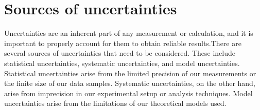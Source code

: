 \section{Sources of uncertainties}
\label{sec:sources-of-uncertainties}
Uncertainties are an inherent part of any measurement or calculation, and it is important to properly account for them to obtain reliable results.There are several sources of uncertainties that need to be considered. These include statistical uncertainties, systematic uncertainties, and model uncertainties. Statistical uncertainties arise from the limited precision of our measurements or the finite size of our data samples. Systematic uncertainties, on the other hand, arise from imprecision in our experimental setup or analysis techniques. Model uncertainties arise from the limitations of our theoretical models used.

%
